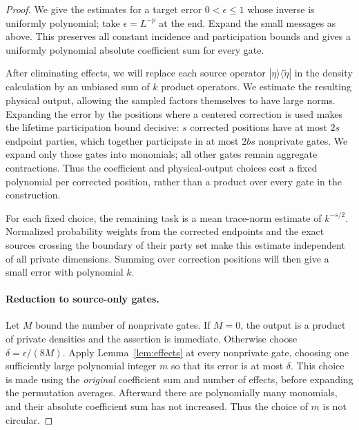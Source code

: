 \begin{proof}
We give the estimates for a target error $0<\epsilon\le1$ whose inverse
is uniformly polynomial; take $\epsilon=L^{-p}$ at the end.  Expand the
small messages as above.  This preserves all constant incidence and
participation bounds and gives a uniformly polynomial absolute
coefficient sum for every gate.

After eliminating effects, we will replace each source operator
$|\eta\rangle\langle\widetilde\eta|$ in the density calculation by an
unbiased sum of $k$ product operators.  We estimate the resulting physical
output, allowing the sampled factors themselves to have large norms.
Expanding the error by the positions where a centered correction is used
makes the lifetime participation bound decisive: $s$ corrected positions
have at most $2s$ endpoint parties, which together participate in at most
$2bs$ nonprivate gates.  We expand only those gates into monomials; all
other gates remain aggregate contractions.  Thus the coefficient and
physical-output choices cost a fixed polynomial per corrected position,
rather than a product over every gate in the construction.

For each fixed choice, the remaining task is a mean trace-norm estimate
of $k^{-s/2}$.  Normalized probability weights from the corrected endpoints
and the exact sources crossing the boundary of their party set make this
estimate
independent of all private dimensions.  Summing over correction positions
will then give a small error with polynomial $k$.

\paragraph{Reduction to source-only gates.}
Let $M$ bound the number of nonprivate gates.  If $M=0$, the output is a
product of private densities and the assertion is immediate.  Otherwise
choose $\delta=\epsilon/(8M)$.  Apply Lemma~\ref{lem:effects} at every
nonprivate gate, choosing one sufficiently large polynomial integer $m$
so that its error is at most $\delta$.  This choice is made using the
\emph{original} coefficient sum and number of effects, before expanding
the permutation averages.  Afterward there are polynomially many
monomials, and their absolute coefficient sum has not increased.  Thus
the choice of $m$ is not circular.


\end{proof}
